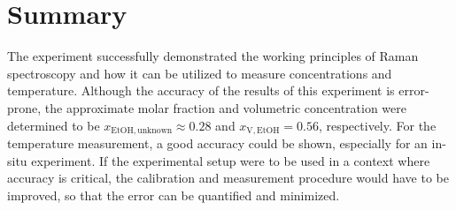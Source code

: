 
\chapter{Summary}
\label{chap:summary}

The experiment successfully demonstrated the working principles of Raman spectroscopy and how it can be utilized to measure concentrations and temperature. Although the accuracy of the results of this experiment is error-prone, the approximate molar fraction and volumetric concentration were determined to be $x_\mathrm{EtOH,unknown} \approx 0.28$ and $x_\mathrm{V,EtOH}=0.56$, respectively. For the temperature measurement, a good accuracy could be shown, especially for an in-situ experiment. If the experimental setup were to be used in a context where accuracy is critical, the calibration and measurement procedure would have to be improved, so that the error can be quantified and minimized.